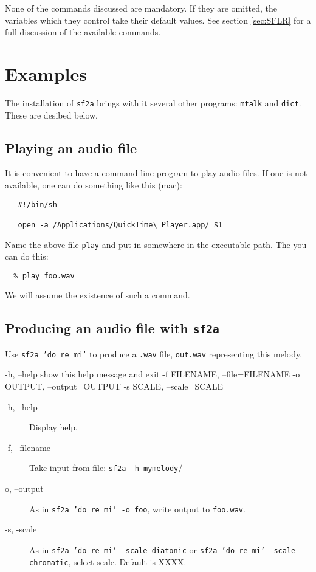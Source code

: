 \documentclass[11pt]{amsart}
\begin{document}
None of the commands discussed are mandatory.  If they are omitted, the variables which they
control take their default values.  See section \ref{sec:SFLR} for a full discussion of the
available commands.

\section{Examples}

The installation of {\tt sf2a} brings with it several other programs: {\tt mtalk} and
{\tt dict}.  These are desibed below.

\subsection{Playing an audio file}

It is convenient to have a command line program to play audio files.
If one is not available, one can do something like this (mac):
\begin{verbatim}
   #!/bin/sh

   open -a /Applications/QuickTime\ Player.app/ $1
\end{verbatim}
Name the above file {\tt play} and put in somewhere in the executable path.
The you can do this:
\begin{verbatim}
  % play foo.wav
\end{verbatim}
We will assume the existence of such a command.

\subsection{Producing an audio file with {\tt sf2a}}

Use {\tt sf2a 'do re mi'} to produce a {\tt .wav} file, {\tt out.wav}
representing this melody.


  -h, --help            show this help message and exit
  -f FILENAME, --file=FILENAME
  -o OUTPUT, --output=OUTPUT
  -s SCALE, --scale=SCALE


\begin{description}

\item[ -h, --help] Display help.

\item[ -f, --filename] Take input from file: {\tt sf2a -h mymelody}/

\item[o, --output] As in {\tt sf2a 'do re mi' -o foo}, write
output to {\tt foo.wav}.

\item[-s, -scale] As in {\tt sf2a 'do re mi' --scale diatonic}
or {\tt sf2a 'do re mi' --scale chromatic}, select scale. Default is XXXX.

\end{description}
\end{document}
